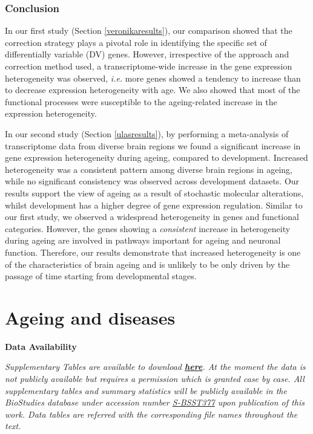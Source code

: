 \documentclass[12pt,twoside]{unicam}
\begin{document}
\hypertarget{conclusion}{%
\subsection{Conclusion}\label{conclusion}}

In our first study (Section \ref{veronikaresults}), our comparison showed that the correction strategy plays a pivotal role in identifying the specific set of differentially variable (DV) genes. However, irrespective of the approach and correction method used, a transcriptome-wide increase in the gene expression heterogeneity was observed, \emph{i.e.} more genes showed a tendency to increase than to decrease expression heterogeneity with age. We also showed that most of the functional processes were susceptible to the ageing-related increase in the expression heterogeneity.

In our second study (Section \ref{ulasresults}), by performing a meta-analysis of transcriptome data from diverse brain regions we found a significant increase in gene expression heterogeneity during ageing, compared to development. Increased heterogeneity was a consistent pattern among diverse brain regions in ageing, while no significant consistency was observed across development datasets. Our results support the view of ageing as a result of stochastic molecular alterations, whilst development has a higher degree of gene expression regulation. Similar to our first study, we observed a widespread heterogeneity in genes and functional categories. However, the genes showing a \emph{consistent} increase in heterogeneity during ageing are involved in pathways important for ageing and neuronal function. Therefore, our results demonstrate that increased heterogeneity is one of the characteristics of brain ageing and is unlikely to be only driven by the passage of time starting from developmental stages.

\hypertarget{UKBBChapter}{%
\chapter{Ageing and diseases}\label{UKBBChapter}}

\small

\textbf{Data Availability}

\emph{Supplementary Tables are available to download \textbf{\href{https://drive.google.com/file/d/1j6AJfTOD9euHCdZTlhtWYn22M1KdaQ5A/view?usp=sharing}{here}}. At the moment the data is not publicly available but requires a permission which is granted case by case. All supplementary tables and summary statistics will be publicly available in the BioStudies database under accession number \href{https://www.ebi.ac.uk/biostudies/studies/S-BSST377}{S-BSST377} upon publication of this work. Data tables are referred with the corresponding file names throughout the text.}
\end{document}
